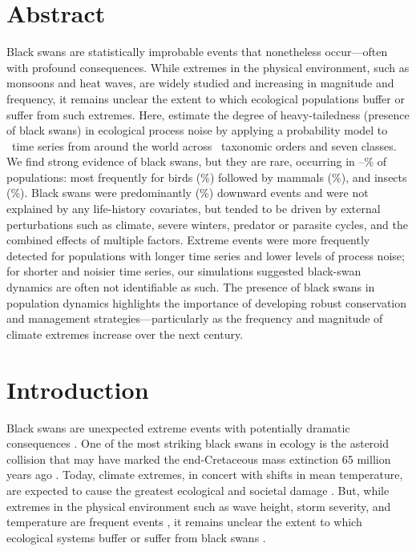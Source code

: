 
\section{Abstract}

Black swans are statistically improbable events that nonetheless occur---often
with profound consequences. While extremes in the physical environment, such
as monsoons and heat waves, are widely studied and increasing in magnitude and
frequency, it remains unclear the extent to which ecological populations
buffer or suffer from such extremes. Here, estimate the degree of
heavy-tailedness (presence of black swans) in ecological process noise by
applying a probability model to \NPops~time series from around the world
across \NOrders~taxonomic orders and seven classes. We find strong evidence of
black swans, but they are rare, occurring in
\overallMinPerc--\overallMaxPerc\% of populations: most frequently for birds
(\AvesRangePerc\%) followed by mammals (\MammaliaRangePerc\%), and insects
(\InsectaRangePerc\%). Black swans were predominantly (\percBSDown \%)
downward events and were not explained by any life-history covariates, but
tended to be driven by external perturbations such as climate, severe winters,
predator or parasite cycles, and the combined effects of multiple factors.
Extreme events were more frequently detected for populations with longer time
series and lower levels of process noise; for shorter and noisier time series,
our simulations suggested black-swan dynamics are often not identifiable as
such. The presence of black swans in population dynamics highlights the
importance of developing robust conservation and management
strategies---particularly as the frequency and magnitude of climate extremes
increase over the next century.

\section{Introduction}

Black swans are unexpected extreme events with potentially dramatic
consequences \citep{taleb2007,sornette2009}. One of the most striking black
swans in ecology is the asteroid collision that may have marked the
end-Cretaceous mass extinction 65 million years ago
\citep{alvarez1980,harnik2012}. Today, climate extremes, in concert with
shifts in mean temperature, are expected to cause the greatest ecological and
societal damage \citep{ipcc2012}. But, while extremes in the physical
environment such as wave height, storm severity, and temperature are frequent
events \citep{gaines1993,katz2005}, it remains unclear the extent to which
ecological systems buffer or suffer from black swans \citep{nunez2012}.

